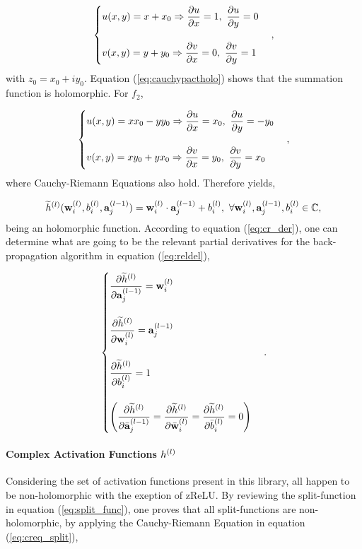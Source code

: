 \begin{equation}
	\begin{cases}
		u(x,y) = x + x_0 \Rightarrow \dfrac{\partial u}{\partial x} = 1, \ \dfrac{\partial u}{\partial y} = 0 \\
		\\
		v(x,y) = y + y_0 \Rightarrow \dfrac{\partial v}{\partial x} = 0, \ \dfrac{\partial v}{\partial y} = 1
	\end{cases},
	\label{eq:cauchypactholo}
\end{equation}
with $ z_0 = x_0 + iy_0 $. Equation (\ref{eq:cauchypactholo}) shows that the summation function is holomorphic. For $ f_2 $,

\begin{equation}
	\begin{cases}
		u(x,y) = x  x_0 - y y_0 \Rightarrow \der{u}{x} = x_0, \ \der{u}{y} = -y_0 \\
		\\
		v(x,y) = x y_0 + y x_0 \Rightarrow \der{v}{x} = y_0, \ \der{v}{y} = x_0
	\end{cases},
\end{equation}
where Cauchy-Riemann Equations also hold. Therefore yields,

\begin{equation}
	\widetilde{h}^{(l)}(\mathbf{w}^{(l)}_{i}, b^{(l)}_{i}, \mathbf{a}^{(l-1)}_{j}) = \mathbf{w}^{(l)}_{i} \cdot \mathbf{a}^{(l-1)}_{j} + b^{(l)}_{i}, \  \forall\mathbf{w}^{(l)}_{i}, \mathbf{a}^{(l-1)}_{j}, b^{(l)}_{i} \in \mathbb{C},
\end{equation}
being an holomorphic function. According to equation (\ref{eq:cr_der}), one can determine what are going to be the relevant partial derivatives for the back-propagation algorithm in equation (\ref{eq:reldel}),

\begin{equation}
	\begin{cases}
		\dfrac{\partial \widetilde{h}^{(l)}}{\partial \mathbf{a}^{(l-1)}_{j}} = \mathbf{w}^{(l)}_{i} \\
		\\
		\dfrac{\partial \widetilde{h}^{(l)}}{\partial \mathbf{w}^{(l)}_{i}} = \mathbf{a}^{(l-1)}_{j} \\
		\\
		\dfrac{\partial \widetilde{h}^{(l)}}{\partial b^{(l)}_{i}} = 1 \\
		\\
		\left( \dfrac{\partial \widetilde{h}^{(l)}}{\partial \bar{\mathbf{a}}^{(l-1)}_{j}} = \dfrac{\partial \widetilde{h}^{(l)}}{\partial \bar{\mathbf{w}}^{(l)}_{i}} = \dfrac{\partial \widetilde{h}^{(l)}}{\partial \bar{b}^{(l)}_{i}} = 0 \right)
	\end{cases}.
	\label{eq:reldel}
\end{equation}

\paragraph{Complex Activation Functions $ h^{(l)} $}
Considering the set of activation functions present in this library, all happen to be non-holomorphic with the exeption of zReLU. By reviewing the split-function in equation (\ref{eq:split_func}), one proves that all split-functions are non-holomorphic, by applying the Cauchy-Riemann Equation in equation (\ref{eq:creq_split}),

